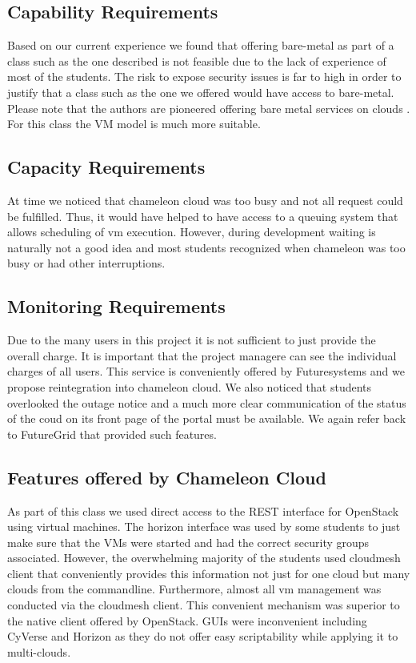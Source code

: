 \documentclass[sigconf]{acmart}
\begin{document}
\subsection{Capability Requirements}

Based on our current experience we found that offering bare-metal as part of a
class such as the one described is not feasible due to the lack of
experience of most of the students. The risk to expose security issues
is far to high in order to justify that a class such as the one we
offered would have access to bare-metal. Please note that the authors
are pioneered offering bare metal services on clouds
\cite{las08federated-cloud}. For this class the VM model is much more
suitable. 

\subsection{Capacity Requirements}

At time we noticed that chameleon cloud was too busy and not all
request could be fulfilled. Thus, it would have helped to have access
to a queuing system that allows scheduling of vm execution. However,
during development waiting is naturally not a good idea and most
students recognized when chameleon was too busy or had other
interruptions. 

\subsection{Monitoring Requirements}

Due to the many users in this project it is not sufficient to just
provide the overall charge. It is important that the project managere
can see the individual charges of all users. This service is
conveniently offered by Futuresystems and we propose reintegration
into chameleon cloud. We also noticed that students overlooked the
outage notice and a much more clear communication of the status of the
coud on its front page of the portal must be available. We again refer
back to FutureGrid that provided such features.

\subsection{Features offered by Chameleon Cloud}

As part of this class we used direct access to the REST interface for
OpenStack using virtual machines. The horizon interface was used by
some students to just make sure that the VMs were started and had the
correct security groups associated. However, the overwhelming majority
of the students used cloudmesh client that conveniently provides this
information not just for one cloud but many clouds from the
commandline. Furthermore, almost all vm management was conducted via
the cloudmesh client. This convenient mechanism was superior to the
native client offered by OpenStack. GUIs were inconvenient including
CyVerse and Horizon as they do not offer easy scriptability while
applying it to multi-clouds. 
\end{document}
